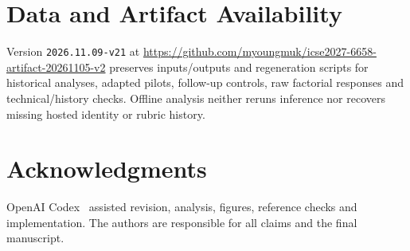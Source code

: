 \documentclass[10pt,conference]{IEEEtran}
\begin{document}
\section*{Data and Artifact Availability}
Version \texttt{2026.11.09-v21} at
\url{https://github.com/myoungmuk/icse2027-6658-artifact-20261105-v2}
preserves inputs/outputs and regeneration scripts for historical analyses, adapted
pilots, follow-up controls, raw factorial responses and technical/history checks.
Offline analysis neither reruns inference nor recovers missing hosted identity or
rubric history.

\section*{Acknowledgments}
OpenAI Codex~\cite{openaicodex} assisted revision, analysis, figures, reference checks and
implementation. The authors are responsible for all claims and the final manuscript.

\clearpage


\end{document}
